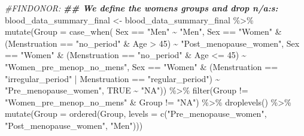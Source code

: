 \documentclass[
]{article}
\newenvironment{Shaded}{\begin{snugshade}}{\end{snugshade}}
\newcommand{\AttributeTok}[1]{\textcolor[rgb]{0.77,0.63,0.00}{#1}}
\newcommand{\CommentTok}[1]{\textcolor[rgb]{0.56,0.35,0.01}{\textit{#1}}}
\newcommand{\ConstantTok}[1]{\textcolor[rgb]{0.00,0.00,0.00}{#1}}
\newcommand{\DecValTok}[1]{\textcolor[rgb]{0.00,0.00,0.81}{#1}}
\newcommand{\DocumentationTok}[1]{\textcolor[rgb]{0.56,0.35,0.01}{\textbf{\textit{#1}}}}
\newcommand{\FunctionTok}[1]{\textcolor[rgb]{0.00,0.00,0.00}{#1}}
\newcommand{\NormalTok}[1]{#1}
\newcommand{\OtherTok}[1]{\textcolor[rgb]{0.56,0.35,0.01}{#1}}
\newcommand{\SpecialCharTok}[1]{\textcolor[rgb]{0.00,0.00,0.00}{#1}}
\newcommand{\StringTok}[1]{\textcolor[rgb]{0.31,0.60,0.02}{#1}}
\begin{document}
\begin{Shaded}
\begin{Highlighting}[]
\CommentTok{\#FINDONOR:}
\DocumentationTok{\#\# We define the women\textquotesingle{}s groups and drop n/a:s: }
\NormalTok{blood\_data\_summary\_final }\OtherTok{\textless{}{-}}\NormalTok{ blood\_data\_summary\_final }\SpecialCharTok{\%\textgreater{}\%} 
  \FunctionTok{mutate}\NormalTok{(}\AttributeTok{Group =} \FunctionTok{case\_when}\NormalTok{(}
\NormalTok{    Sex }\SpecialCharTok{==} \StringTok{"Men"} \SpecialCharTok{\textasciitilde{}} \StringTok{"Men"}\NormalTok{, }
\NormalTok{    Sex }\SpecialCharTok{==} \StringTok{"Women"} \SpecialCharTok{\&}\NormalTok{ (Menstruation }\SpecialCharTok{==} \StringTok{"no\_period"} \SpecialCharTok{\&}\NormalTok{ Age }\SpecialCharTok{\textgreater{}} \DecValTok{45}\NormalTok{) }\SpecialCharTok{\textasciitilde{}} \StringTok{"Post\_menopause\_women"}\NormalTok{,}
\NormalTok{    Sex }\SpecialCharTok{==} \StringTok{"Women"} \SpecialCharTok{\&}\NormalTok{ (Menstruation }\SpecialCharTok{==} \StringTok{"no\_period"} \SpecialCharTok{\&}\NormalTok{ Age }\SpecialCharTok{\textless{}=} \DecValTok{45}\NormalTok{) }\SpecialCharTok{\textasciitilde{}} \StringTok{"Women\_pre\_menop\_no\_mens"}\NormalTok{,}
\NormalTok{    Sex }\SpecialCharTok{==} \StringTok{"Women"} \SpecialCharTok{\&}\NormalTok{ (Menstruation }\SpecialCharTok{==} \StringTok{"irregular\_period"} \SpecialCharTok{|}\NormalTok{ Menstruation }\SpecialCharTok{==} \StringTok{"regular\_period"}\NormalTok{) }\SpecialCharTok{\textasciitilde{}} \StringTok{"Pre\_menopause\_women"}\NormalTok{,}
    \ConstantTok{TRUE} \SpecialCharTok{\textasciitilde{}} \StringTok{"NA"}\NormalTok{)) }\SpecialCharTok{\%\textgreater{}\%} 
  \FunctionTok{filter}\NormalTok{(Group }\SpecialCharTok{!=} \StringTok{"Women\_pre\_menop\_no\_mens"} \SpecialCharTok{\&}\NormalTok{ Group }\SpecialCharTok{!=} \StringTok{"NA"}\NormalTok{) }\SpecialCharTok{\%\textgreater{}\%} 
  \FunctionTok{droplevels}\NormalTok{() }\SpecialCharTok{\%\textgreater{}\%} 
  \FunctionTok{mutate}\NormalTok{(}\AttributeTok{Group =} \FunctionTok{ordered}\NormalTok{(Group, }\AttributeTok{levels =}  \FunctionTok{c}\NormalTok{(}\StringTok{"Pre\_menopause\_women"}\NormalTok{, }\StringTok{"Post\_menopause\_women"}\NormalTok{, }\StringTok{"Men"}\NormalTok{))) }


\end{Highlighting}
\end{Shaded}
\end{document}
